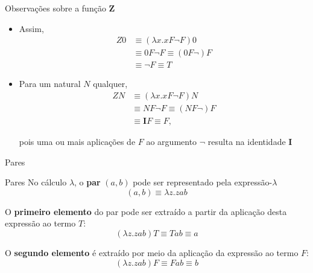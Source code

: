 \begin{frame}[fragile]{Observações sobre a função $\mathbf{Z}$}

    \begin{itemize}
        \item Assim,
        \begin{align*}
            Z0 &\equiv (\lambda x.xF\lnot F)0 \\
            &\equiv 0F\lnot F \equiv (0F\lnot)F \\
            &\equiv \lnot F \equiv T
        \end{align*}
            
        \item Para um natural $N$ qualquer,
        \begin{align*}
            ZN &\equiv (\lambda x.xF\lnot F)N \\
            &\equiv NF\lnot F \equiv (NF\lnot)F \\
            &\equiv \mathbf{I} F \equiv F,
        \end{align*}
 
        pois uma ou mais aplicações de $F$ ao argumento $\lnot$ resulta na identidade $\mathbf{I}$
    \end{itemize}

\end{frame}

\begin{frame}[fragile]{Pares}

    \begin{block}{Pares}
    No cálculo $\lambda$, o \textbf{par} $(a, b)$ pode ser representado pela expressão-$\lambda$
    \[
        (a, b) \equiv \lambda z.zab
    \]

    O \textbf{primeiro elemento} do par pode ser extraído a partir da aplicação desta expressão ao
        termo $T$:
    \[
        (\lambda z.zab)T \equiv Tab \equiv a
    \]

    O \textbf{segundo elemento} é extraído por meio da aplicação da expressão ao termo $F$:
    \[
        (\lambda z.zab)F \equiv Fab \equiv b
    \]
    \end{block}

\end{frame}

